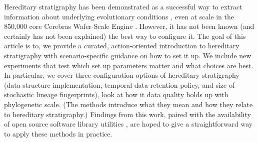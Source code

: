 Hereditary stratigraphy has been demonstrated as a successful way to extract information about underlying evolutionary conditions \citep{moreno2024ecology}, even at scale in the 850,000 core Cerebras Wafer-Scale Engine \citep{moreno2024trackable}.
However, it has not been known (and certainly has not been explained) the best way to configure it.
The goal of this article is to, we provide a curated, action-oriented introduction to hereditary stratigraphy with scenario-specific guidance on how to set it up.
We include new experiments that test which set up parameters matter and what choices are best.
In particular, we cover three configuration options of hereditary stratigraphy (data structure implementation, temporal data retention policy, and size of stochastic lineage fingerprints), look at how it data quality holds up with phylogenetic scale.
(The methods introduce what they mean and how they relate to hereditary stratigraphy.)
Findings from this work, paired with the availability of open source software library utilities \citep{TODO}, are hoped to give a straightforward way to apply these methods in practice.
